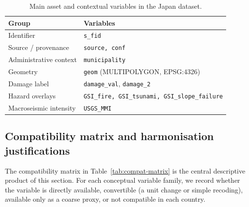 \documentclass[11pt,a4paper]{article}
\begin{document}
\begin{table}[!t]
\centering
\caption{Main asset and contextual variables in the Japan dataset.}
\label{tab:japan-vars}
\small
\begin{tabularx}{\linewidth}{l X}
\toprule
\textbf{Group} & \textbf{Variables} \\
\midrule
Identifier & \texttt{s\_fid} \\
Source / provenance & \texttt{source, conf} \\
Administrative context & \texttt{municipality} \\
Geometry & \texttt{geom} (MULTIPOLYGON, EPSG:4326) \\
Damage label & \texttt{damage\_val}, \texttt{damage\_2} \\
Hazard overlays & \texttt{GSI\_fire, GSI\_tsunami, GSI\_slope\_failure} \\
Macroseismic intensity & \texttt{USGS\_MMI} \\
\bottomrule
\end{tabularx}
\end{table}

\subsection{Compatibility matrix and harmonisation justifications}
\label{sec:data-compat-matrix}

The compatibility matrix in Table~\ref{tab:compat-matrix} is the central descriptive product of this section. For each conceptual variable family, we record whether the variable is directly available, convertible (a unit change or simple recoding), available only as a coarse proxy, or not compatible in each country.
\end{document}
